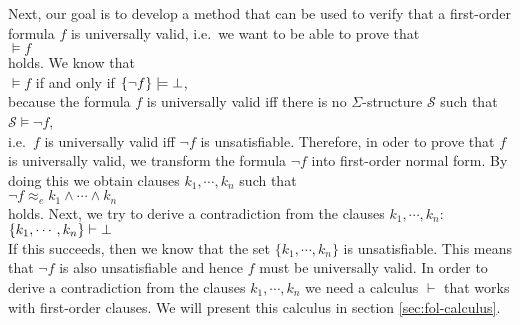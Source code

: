Next, our goal is to develop a method that can be used to verify that a first-order formula
$f$ is universally valid, i.e.~we want to be able to prove that \\[0.2cm]
\hspace*{1.3cm}
$\models f$
\\[0.2cm]
holds.  We know that \\[0.2cm]
\hspace*{1.3cm}
$\models f$ \quad if and only if \quad $\{\neg f\} \models \bot$, \\[0.2cm]
because the formula $f$ is universally valid iff there is no $\Sigma$-structure $\mathcal{S}$ such that
\\[0.2cm]
\hspace*{1.3cm}
$\mathcal{S} \models \neg f$,
\\[0.2cm]
i.e.~$f$ is universally valid iff $\neg f$ is unsatisfiable. 
Therefore, in oder to prove that $f$ is universally valid, we transform the formula $\neg f$  into 
first-order normal form.  By doing this we obtain clauses $k_1, \cdots, k_n$ such that \\[0.2cm]
\hspace*{1.3cm} $\neg f \approx_e k_1 \wedge \cdots \wedge k_n$ \\[0.2cm]
holds.  Next,  we try to
derive a contradiction from the clauses $k_1,\cdots,k_n$: \\[0.2cm]
\hspace*{1.3cm} $\{k_1, \cdots, k_n\} \vdash \bot$ \\[0.2cm]
If this succeeds, then we know that the set $\{k_1, \cdots, k_n\}$ is unsatisfiable.
This means that $\neg f$ is also unsatisfiable and hence $f$ must be universally valid.
In order to derive a contradiction from the clauses $k_1,\cdots,k_n$
we need a calculus $\vdash$ that works with first-order clauses. 
We will present this calculus in section \ref{sec:fol-calculus}.

